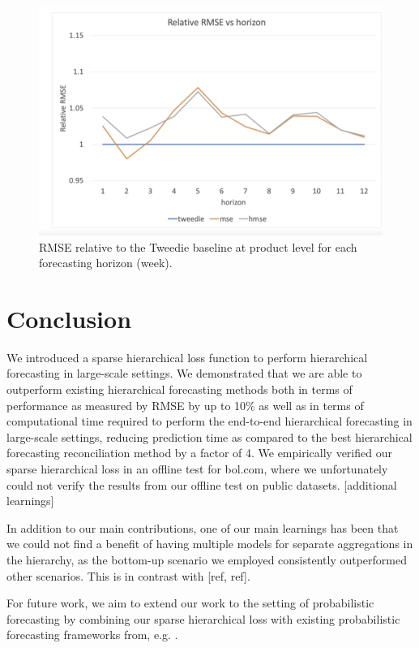 \documentclass[preprint, 3p, times, twocolumn]{elsarticle}
\begin{document}
  \begin{figure}[t]
    \centering
    \centerline{\includegraphics[width=\columnwidth]{assets/bol_rmse.png}}
    \caption{RMSE relative to the Tweedie baseline at product level for each forecasting horizon (week).}
    \label{fig:bol_rmse}
  \end{figure}

\section{Conclusion} \label{sec:conclusion}
  We introduced a sparse hierarchical loss function to perform hierarchical forecasting in large-scale settings. We demonstrated that we are able to outperform existing hierarchical forecasting methods both in terms of performance as measured by RMSE by up to 10\% as well as in terms of computational time required to perform the end-to-end hierarchical forecasting in large-scale settings, reducing prediction time as compared to the best hierarchical forecasting reconciliation method by a factor of 4. We empirically verified our sparse hierarchical loss in an offline test for bol.com, where we unfortunately could not verify the results from our offline test on public datasets. [additional learnings] 

  In addition to our main contributions, one of our main learnings has been that we could not find a benefit of having multiple models for separate aggregations in the hierarchy, as the bottom-up scenario we employed consistently outperformed other scenarios. This is in contrast with [ref, ref].

  For future work, we aim to extend our work to the setting of probabilistic forecasting by combining our sparse hierarchical loss with existing probabilistic forecasting frameworks from, e.g. \cite{sprangers_probabilistic_2021, hasson_probabilistic_2021, stankeviciute_conformal_2021}.
\end{document}
